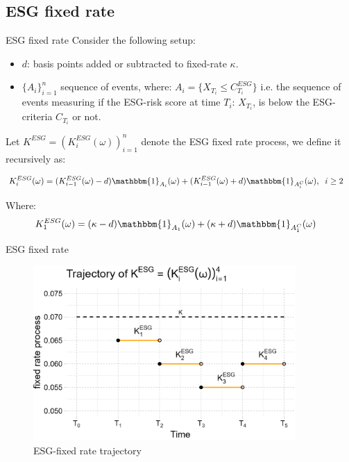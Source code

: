 \documentclass[UKenglish]{beamer}
\begin{document}
\subsection{ESG fixed rate}

\begin{frame}{ESG fixed rate}
Consider the following setup: 
\begin{itemize}
    \item $d$: basis points added or subtracted to fixed-rate $\kappa$. 
    \item $\{A_{i}\}_{i=1}^{n}$ sequence of events, where: 
    $A_{i} = \{X_{T_{i}} \leq C_{T_{i}}^{ESG}\}$
    i.e. the sequence of events measuring if the ESG-risk score at time $T_{i}$: $X_{T_{i}}$, is below the ESG-criteria $C_{T_{i}}$ or not. 
\end{itemize}

\begin{definition}
Let $K^{ESG} = (K_{i}^{ESG}(\omega))_{i=1}^{n}$ 
denote the ESG fixed rate process, we define it recursively as: 

\begin{align*}
K_{i}^{ESG}(\omega) &= (K_{i-1}^{ESG}(\omega)-d)\mathbbm{1}_{A_{i}}(\omega)
+ (K_{i-1}^{ESG}(\omega)+d)\mathbbm{1}_{A_{i}^{C}}(\omega), \;\; i\geq 2
\end{align*}

Where:
\begin{align*}
K_{1}^{ESG}(\omega) &= (\kappa - d)\mathbbm{1}_{A_{1}}(\omega)
+ (\kappa + d)\mathbbm{1}_{A_{1}^{C}}(\omega)    
\end{align*}
\end{definition}

\end{frame}

\begin{frame}{ESG fixed rate}
\begin{figure}[htp]
    \centering
    \includegraphics[width=10cm]{ESG/SBM_ESG_path.png}
    \caption{ESG-fixed rate trajectory}
    \label{fig: SBM_ESG_path}
\end{figure}
\end{frame}
\end{document}
